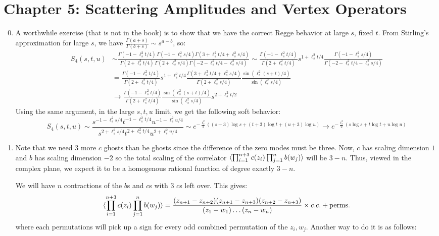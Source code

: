 \documentclass[11pt, class=article, crop=false]{standalone}
\begin{document}
\section*{Chapter 5: Scattering Amplitudes and Vertex Operators} %
\label{sec:chapter_5_scattering_amplitudes_and_vertex_operators}
\begin{enumerate}
	\setcounter{enumi}{-1}
	\item A worthwhile exercise (that is not in the book) is to show that we have the correct Regge behavior at large $s$, fixed $t$. From Stirling's approximation for large $s$, we have $\frac{\Gamma(a + s)}{\Gamma(b + s)} \sim s^{a-b}$, so:
	\[
	\begin{aligned}
		S_{4} (s, t, u) &\sim %
		  \frac{\Gamma(-1 - \ell_s^2 t/4) \, \Gamma(-1 - \ell_s^2 s/4)\Gamma(3 + \ell_s^2 t/4 + \ell_s^2 s/4)}{\Gamma(2 + \ell_s^2 t/4) \, \Gamma(2 + \ell_s^2 s/4)  \Gamma(-2-\ell_s^2 t/ 4 - \ell_s^2 s/4)} \sim \frac{\Gamma(-1 - \ell_s^2 t/4)}{\Gamma(2 + \ell_s^2 t/4)} s^{1 + \ell_s^2 t/4} \frac{\Gamma(-1 - \ell_s^2 s/4)}{\Gamma(-2 -\ell_s^2 t/4 - \ell_s^2 s/4)}\\
		  & = \frac{\Gamma(-1 - \ell_s^2 t/4)}{\Gamma(2 + \ell_s^2 t/4)} s^{1 + \ell_s^2 t/4} \frac{\Gamma(3 +\ell_s^2 t/4 + \ell_s^2 s/4)}{\Gamma(2 + \ell_s^2 s/4)} \frac{\sin(\ell_s^2 (s + t)/4)}{\sin(\ell_s^2 s/ 4)} \\
		  & \to \frac{\Gamma(-1 - \ell_s^2 t/4)}{\Gamma(2 + \ell_s^2 t/4)}  \frac{\sin(\ell_s^2 (s + t)/4)}{\sin(\ell_s^2 s/ 4)} s^{2 + \ell_s^2 t/2}
	\end{aligned}
	\]
	Using the same argument, in the large $s, t, u$ limit, we get the following soft behavior: 
	\[
		S_4(s, t, u) \sim \frac{s^{-1-\ell_s^2 s/4} t^{-1 - \ell_s^2 t/4} u^{-1-\ell_s^2 u/4}}{s^{2+\ell_s^2 s/4} t^{2 + \ell_s^2 t/4} u^{2+\ell_s^2 u/4}} \sim e^{-\frac{\ell_s^2}{2}((s+3) \log s + (t+3) \log t + (u+3) \log u)} \to e^{-\frac{\ell_s^2}{2} (s \log s + t \log t + u\log u)}
	\]
	\item
	Note that we need 3 more $c$ ghosts than be ghosts since the difference of the zero modes must be three. Now, $c$ has scaling dimension $1$ and $b$ has scaling dimension $-2$ so the total scaling of the correlator $\braket{\prod_{i=1}^{n+3} c(z_i) \prod_{j=1}^n b(w_j)}$ will be $3-n$. Thus, viewed in the complex plane, we expect it to be a homogenous rational function of degree exactly $3-n$.
	
	 We will have $n$ contractions of the $b$s and $c$s with $3$ $c$s left over. This gives:
	\[
		\braket{\prod_{i=1}^{n+3} c(z_i) \prod_{j=1}^n b(w_j)} = \frac{(z_{n+1} - z_{n+2}) (z_{n+1} - z_{n+3}) (z_{n+2} - z_{n+3})}{(z_1 - w_1) \dots (z_n - w_n)} \times c.c. + \text{perms.}
	\]
	where each permutations will pick up a sign for every odd combined permutation of the $z_i, w_j$.
	Another way to do it is as follows: 
	

\end{enumerate}
\end{document}
